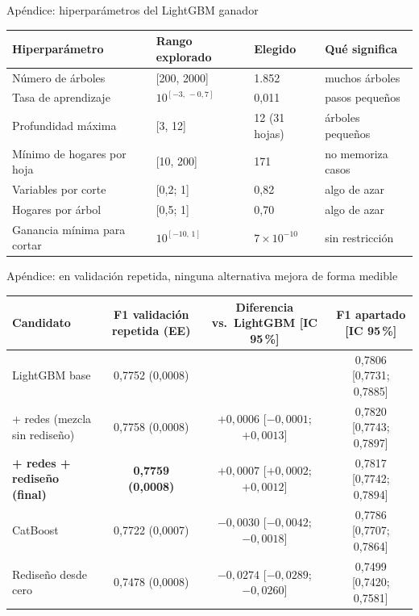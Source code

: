 \documentclass[aspectratio=169,11pt]{beamer}
\begin{document}
\begin{frame}{Apéndice: hiperparámetros del LightGBM ganador}
  \centering\footnotesize\renewcommand{\arraystretch}{1.12}
  \begin{tabular}{@{}llll@{}}
    \toprule
    Hiperparámetro & Rango explorado & Elegido & Qué significa \\
    \midrule
    Número de árboles & [200, 2000] & 1.852 & muchos árboles \\
    Tasa de aprendizaje & $10^{[-3,\,-0{,}7]}$ & 0,011 & pasos pequeños \\
    Profundidad máxima & [3, 12] & 12 (31 hojas) & árboles pequeños \\
    Mínimo de hogares por hoja & [10, 200] & 171 & no memoriza casos \\
    Variables por corte & [0,2; 1] & 0,82 & algo de azar \\
    Hogares por árbol & [0,5; 1] & 0,70 & algo de azar \\
    Ganancia mínima para cortar & $10^{[-10,\,1]}$ & $7\times10^{-10}$ & sin restricción \\
    \bottomrule
  \end{tabular}
\end{frame}

\begin{frame}{Apéndice: en validación repetida, ninguna alternativa mejora de forma medible}
  \centering\scriptsize\setlength{\tabcolsep}{4pt}
  \begin{tabular}{@{}lccc@{}}
    \toprule
    Candidato & F1 validación repetida (EE) & Diferencia vs.\ LightGBM [IC 95\,\%] & F1 apartado [IC 95\,\%] \\
    \midrule
    LightGBM base & 0,7752 (0,0008) & & 0,7806 [0,7731; 0,7885] \\
    + redes (mezcla sin rediseño) & 0,7758 (0,0008) & $+0{,}0006$ [$-0{,}0001$; $+0{,}0013$] & 0,7820 [0,7743; 0,7897] \\
    \textbf{+ redes + rediseño (final)} & \textbf{0,7759 (0,0008)} & $+0{,}0007$ [$+0{,}0002$; $+0{,}0012$] & 0,7817 [0,7742; 0,7894] \\
    CatBoost & 0,7722 (0,0007) & $-0{,}0030$ [$-0{,}0042$; $-0{,}0018$] & 0,7786 [0,7707; 0,7864] \\
    Rediseño desde cero & 0,7478 (0,0008) & $-0{,}0274$ [$-0{,}0289$; $-0{,}0260$] & 0,7499 [0,7420; 0,7581] \\
    \bottomrule
  \end{tabular}
\end{frame}
\end{document}
